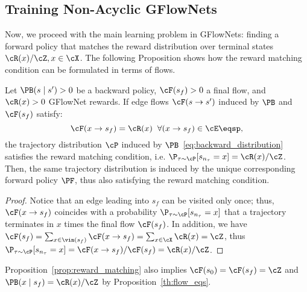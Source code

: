 \subsection{Training Non-Acyclic GFlowNets}
\label{sec:learn_non_acyclic}

Now, we proceed with the main learning problem in GFlowNets: finding a forward policy that matches the reward distribution over terminal states $\cR(x) / \cZ, x \in \cX$. The following Proposition shows how the reward matching condition can be formulated in terms of flows.
\begin{proposition}\label{prop:reward_matching}
    Let $\PB(s \mid s') > 0$ be a backward policy, $\cF(s_f) > 0$ a final flow, and $\cR(x) > 0$ GFlowNet rewards. If edge flows $\cF(s \to s')$ induced by $\PB$ and $\cF(s_f)$ satisfy: 
    \begin{equation}\label{eq:flow_reward_matching}
        \cF(x \to s_f) = \cR(x) \;\; \forall (x \to s_f) \in \cE\eqsp,
    \end{equation}
    the trajectory distribution $\cP$ induced by $\PB$~\eqref{eq:backward_distribution} satisfies the reward matching condition, i.e. $\P_{\tau \sim \cP}[s_{n_\tau} = x] = \cR(x) / \cZ$. Then, the same trajectory distribution is induced by the unique corresponding forward policy $\PF$, thus also satisfying the reward matching condition.
\end{proposition}
\begin{proof}
Notice that an edge leading into $s_f$ can be visited only once; thus, $\cF(x \to s_f)$ coincides with a probability $\P_{\tau \sim \cP}[s_{n_\tau} = x]$ that a trajectory terminates in $x$ times the final flow $\cF(s_f)$. In addition, we have $\cF(s_f) = \sum_{x \in \vin(s_f)} \cF(x \to s_f) = \sum_{x \in \cX} \cR(x) = \cZ$, thus $\P_{\tau \sim \cP}[s_{n_\tau} = x] = \cF(x \to s_f) / \cF(s_f) = \cR(x) / \cZ$.
\end{proof}

Proposition~\ref{prop:reward_matching} also implies $\cF(s_0) = \cF(s_f) = \cZ$ and $\PB(x \mid s_f) = \cR(x) / \cZ$ by Proposition~\ref{th:flow_eqs}.


